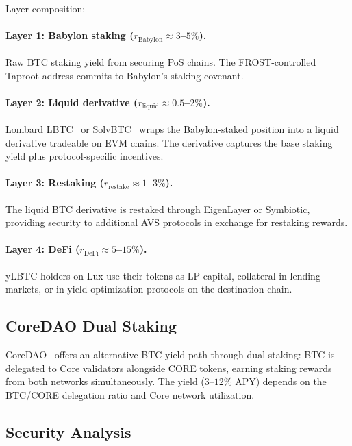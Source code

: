 \documentclass[11pt,twocolumn]{article}
\begin{document}
\noindent
Layer composition:

\paragraph{Layer 1: Babylon staking ($r_{\text{Babylon}} \approx 3$--$5\%$).} Raw BTC staking yield from securing PoS chains. The FROST-controlled Taproot address commits to Babylon's staking covenant.

\paragraph{Layer 2: Liquid derivative ($r_{\text{liquid}} \approx 0.5$--$2\%$).} Lombard LBTC~\cite{lombard2024} or SolvBTC~\cite{solvbtc} wraps the Babylon-staked position into a liquid derivative tradeable on EVM chains. The derivative captures the base staking yield plus protocol-specific incentives.

\paragraph{Layer 3: Restaking ($r_{\text{restake}} \approx 1$--$3\%$).} The liquid BTC derivative is restaked through EigenLayer or Symbiotic, providing security to additional AVS protocols in exchange for restaking rewards.

\paragraph{Layer 4: DeFi ($r_{\text{DeFi}} \approx 5$--$15\%$).} yLBTC holders on Lux use their tokens as LP capital, collateral in lending markets, or in yield optimization protocols on the destination chain.

\subsection{CoreDAO Dual Staking}

CoreDAO~\cite{coredao} offers an alternative BTC yield path through dual staking: BTC is delegated to Core validators alongside CORE tokens, earning staking rewards from both networks simultaneously. The yield ($3$--$12\%$ APY) depends on the BTC/CORE delegation ratio and Core network utilization.

\subsection{Security Analysis}
\end{document}
